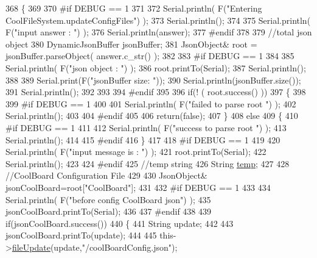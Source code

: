 \begin{DoxyCode}
368 \{
369 
370 \textcolor{preprocessor}{#if DEBUG == 1}
371 
372     Serial.println( F(\textcolor{stringliteral}{"Entering CoolFileSystem.updateConfigFiles"}) );
373     Serial.println();
374     
375     Serial.println( F(\textcolor{stringliteral}{"input answer : "}) );
376     Serial.println(answer);
377 \textcolor{preprocessor}{#endif}
378 
379     \textcolor{comment}{//total json object }
380     DynamicJsonBuffer jsonBuffer;
381     JsonObject& root = jsonBuffer.parseObject( answer.c\_str() );
382 
383 \textcolor{preprocessor}{#if DEBUG == 1}
384     
385     Serial.println( F(\textcolor{stringliteral}{"json object : "}) );  
386     root.printTo(Serial);
387     Serial.println();
388     
389     Serial.print(F(\textcolor{stringliteral}{"jsonBuffer size: "}));
390     Serial.println(jsonBuffer.size());
391     Serial.println();
392 
393 
394 \textcolor{preprocessor}{#endif}
395 
396     \textcolor{keywordflow}{if}(! ( root.success() ))
397     \{
398     
399 \textcolor{preprocessor}{    #if DEBUG == 1}
400 
401         Serial.println( F(\textcolor{stringliteral}{"failed to parse root "}) );
402         Serial.println();
403     
404 \textcolor{preprocessor}{    #endif}
405 
406         \textcolor{keywordflow}{return}(\textcolor{keyword}{false});
407     \}
408     \textcolor{keywordflow}{else}
409     \{
410 \textcolor{preprocessor}{    #if DEBUG == 1}
411         
412         Serial.println( F(\textcolor{stringliteral}{"success to parse root "}) );
413         Serial.println();
414         
415 \textcolor{preprocessor}{    #endif  }
416     \}
417     
418 \textcolor{preprocessor}{#if DEBUG == 1}
419 
420     Serial.println( F(\textcolor{stringliteral}{"input message is : "}) );
421     root.printTo(Serial);
422     Serial.println();
423 
424 \textcolor{preprocessor}{#endif}
425     \textcolor{comment}{//temp string}
426     String \hyperlink{_irene3000_8h_a5905d48604152cf57aa6bfa087b49173}{temp};
427 
428     \textcolor{comment}{//CoolBoard Configuration File}
429 
430         JsonObject& jsonCoolBoard=root[\textcolor{stringliteral}{"CoolBoard"}];
431 
432 \textcolor{preprocessor}{#if DEBUG == 1}
433 
434     Serial.println( F(\textcolor{stringliteral}{"before config CoolBoard json"}) );
435     jsonCoolBoard.printTo(Serial);
436 
437 \textcolor{preprocessor}{#endif}
438 
439     \textcolor{keywordflow}{if}(jsonCoolBoard.success())
440     \{
441         String update;
442     
443         jsonCoolBoard.printTo(update);
444 
445         this->\hyperlink{class_cool_file_system_a13f2958f5b87757c31fc53797a30d23a}{fileUpdate}(update,\textcolor{stringliteral}{"/coolBoardConfig.json"});     

\end{DoxyCode}
